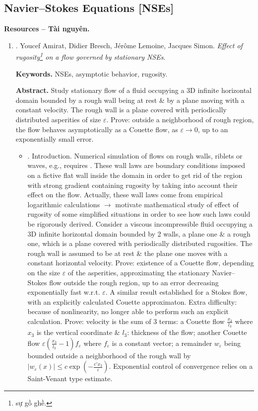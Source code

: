 \documentclass{article}
\begin{document}
\subsection{Navier--Stokes Equations [NSEs]}
\textbf{\textsf{Resources -- Tài nguyên.}}
\begin{enumerate}
	\item \cite{Amirat_Bresch_Lemoine_Simon2001}. {\sc Youcef Amirat, Didier Bresch, J\'{e}r\^{o}me Lemoine, Jacques Simon}. {\it Effect of rugosity\footnote{sự gồ ghề.} on a flow governed by stationary NSEs}. {\sf[92 citations]}
	
	{\bf Keywords.} NSEs, asymptotic behavior, rugosity.
	
	{\bf Abstract.} Study stationary flow of a fluid occupying a 3D infinite horizontal domain bounded by a rough wall being at rest \& by a plane moving with a constant velocity. The rough wall is a plane covered with periodically distributed asperities of size $\varepsilon$. Prove: outside a neighborhood of rough region, the flow behaves asymptotically as a Couette flow, as $\varepsilon\to0$, up to an exponentially small error.
	\begin{itemize}
		\item {. Introduction.} Numerical simulation of flows on rough walls, riblets or waves, e.g., requires . These wall laws are boundary conditions imposed on a fictive flat wall inside the domain in order to get rid of the region with strong gradient containing rugosity by taking into account their effect on the flow. Actually, these wall laws come from empirical logarithmic calculations $\to$ motivate mathematical study of effect of rugosity of some simplified situations in order to see how such laws could be rigorously derived. Consider a viscous incompressible fluid occupying a 3D infinite horizontal domain bounded by 2 walls, a plane one \& a rough one, which is a plane covered with periodically distributed rugosities. The rough wall is assumed to be at rest \& the plane one moves with a constant horizontal velocity. Prove: existence of a Couette flow, depending on the size $\varepsilon$ of the asperities, approximating the stationary Navier--Stokes flow outside the rough region, up to an error decreasing exponentially fast w.r.t. $\varepsilon$. A similar result established for a Stokes flow, with an explicitly calculated Couette approximaton. Extra difficulty: because of nonlinearity, no longer able to perform such an explicit calculation. Prove: velocity is the sum of 3 terms: a Couette flow $\frac{x_3}{l_3}$ where $x_3$ is the vertical coordinate \& $l_3$: thickness of the flow; another Couette flow $\varepsilon\left(\frac{x_3}{l_3} - 1\right)f_\varepsilon$ where $f_\varepsilon$ is a constant vector; a remainder $w_\varepsilon$ being bounded outside a neighborhood of the rough wall by $|w_\varepsilon(x)|\le c\exp\left(-\frac{c'x_3}{\varepsilon}\right)$. Exponential control of convergence relies on a Saint-Venant type estimate.
	\end{itemize}	
	

\end{enumerate}
\end{document}

